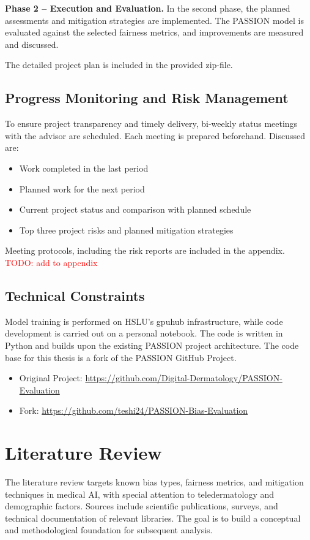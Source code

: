 \documentclass[12pt, a4paper, oneside]{book}   	%
\renewcommand{\todo}[1]{\textcolor{red}{TODO: #1}}
\begin{document}
		\textbf{Phase 2 – Execution and Evaluation.} In the second phase, the planned assessments and mitigation strategies are implemented. The PASSION model is evaluated against the selected fairness metrics, and improvements are measured and discussed.
		
		The detailed project plan is included in the provided zip-file.
		
		\subsection{Progress Monitoring and Risk Management}
		To ensure project transparency and timely delivery, bi-weekly status meetings with the advisor are scheduled. Each meeting is prepared beforehand. Discussed are:
		\begin{itemize}
			\item Work completed in the last period
			\item Planned work for the next period
			\item Current project status and comparison with planned schedule
			\item Top three project risks and planned mitigation strategies
		\end{itemize}
		
		Meeting protocols, including the risk reports are included in the appendix. \todo{add to appendix}
		
		\subsection{Technical Constraints}
		Model training is performed on \gls{HSLU}'s \gls{gpuhub} infrastructure, while code development is carried out on a personal notebook. The code is written in Python and builds upon the existing PASSION project architecture.
		The code base for this thesis is a fork of the PASSION GitHub Project.
		\begin{itemize}
			\item Original Project: \href{https://github.com/Digital-Dermatology/PASSION-Evaluation}{https://github.com/Digital-Dermatology/PASSION-Evaluation}
			\item Fork: \href{https://github.com/teshi24/PASSION-Bias-Evaluation}{https://github.com/teshi24/PASSION-Bias-Evaluation}
		\end{itemize}
		
		
		\section{Literature Review}
		The literature review targets known bias types, fairness metrics, and mitigation techniques in medical \gls{AI}, with special attention to \gls{teledermatology} and demographic factors. Sources include scientific publications, surveys, and technical documentation of relevant libraries. The goal is to build a conceptual and methodological foundation for subsequent analysis.
		
\end{document}
